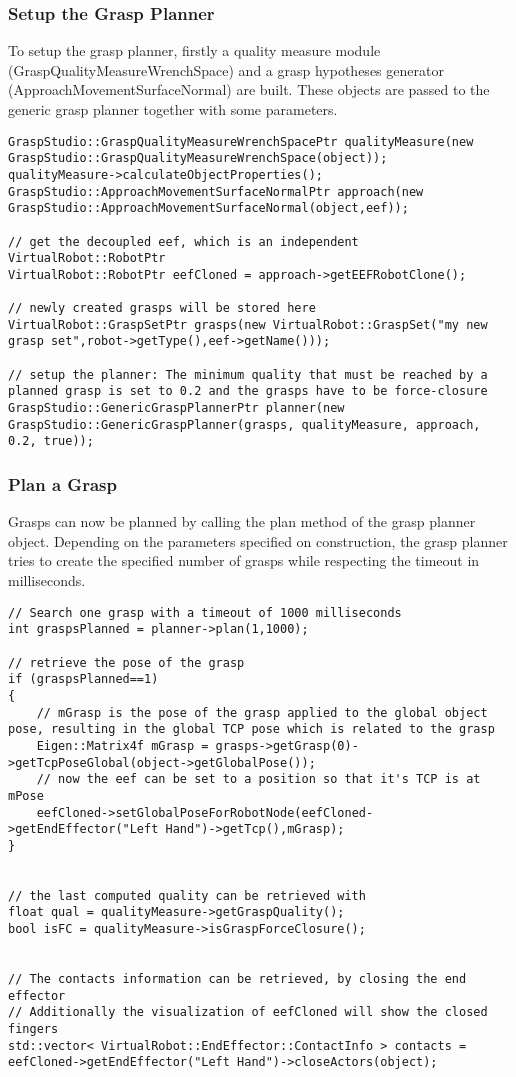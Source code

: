 \subsubsection{Setup the Grasp Planner}
To setup the grasp planner, firstly a quality measure module (GraspQualityMeasureWrenchSpace) and a grasp hypotheses generator (ApproachMovementSurfaceNormal) are built. These objects are passed to the generic grasp planner together with some parameters. 
\begin{lstlisting}
GraspStudio::GraspQualityMeasureWrenchSpacePtr qualityMeasure(new GraspStudio::GraspQualityMeasureWrenchSpace(object));
qualityMeasure->calculateObjectProperties();
GraspStudio::ApproachMovementSurfaceNormalPtr approach(new GraspStudio::ApproachMovementSurfaceNormal(object,eef));

// get the decoupled eef, which is an independent VirtualRobot::RobotPtr
VirtualRobot::RobotPtr eefCloned = approach->getEEFRobotClone();

// newly created grasps will be stored here 
VirtualRobot::GraspSetPtr grasps(new VirtualRobot::GraspSet("my new grasp set",robot->getType(),eef->getName()));

// setup the planner: The minimum quality that must be reached by a planned grasp is set to 0.2 and the grasps have to be force-closure
GraspStudio::GenericGraspPlannerPtr planner(new GraspStudio::GenericGraspPlanner(grasps, qualityMeasure, approach, 0.2, true));
\end{lstlisting}
\subsubsection{Plan a Grasp}
Grasps can now be planned by calling the plan method of the grasp planner object. Depending on the parameters specified on construction, the grasp planner tries to create the specified number of grasps while respecting the timeout in milliseconds. 
\begin{lstlisting}
// Search one grasp with a timeout of 1000 milliseconds
int graspsPlanned = planner->plan(1,1000);

// retrieve the pose of the grasp
if (graspsPlanned==1)
{
    // mGrasp is the pose of the grasp applied to the global object pose, resulting in the global TCP pose which is related to the grasp
    Eigen::Matrix4f mGrasp = grasps->getGrasp(0)->getTcpPoseGlobal(object->getGlobalPose());
    // now the eef can be set to a position so that it's TCP is at mPose 
    eefCloned->setGlobalPoseForRobotNode(eefCloned->getEndEffector("Left Hand")->getTcp(),mGrasp);
}


// the last computed quality can be retrieved with
float qual = qualityMeasure->getGraspQuality();
bool isFC = qualityMeasure->isGraspForceClosure();


// The contacts information can be retrieved, by closing the end effector
// Additionally the visualization of eefCloned will show the closed fingers
std::vector< VirtualRobot::EndEffector::ContactInfo > contacts = eefCloned->getEndEffector("Left Hand")->closeActors(object);
\end{lstlisting}
